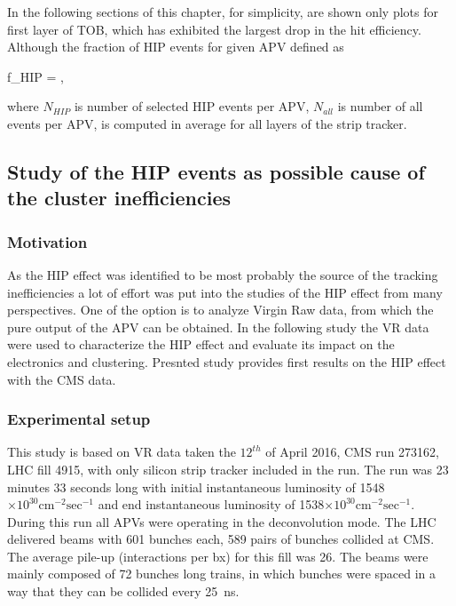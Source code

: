In the following sections of this chapter, for simplicity, are shown only plots for first layer of TOB, which has exhibited the largest drop in the hit efficiency. Although the fraction of HIP events for given APV defined as


{
f_{HIP} = ,
}

where $N_{HIP}$ is number of selected HIP events per APV, $N_{all}$ is number of all events per APV, is computed in average for all layers of the strip tracker.


\subsection{Study of the HIP events as possible cause of the cluster inefficiencies~\label{sec:firstStudy}}

\subsubsection{Motivation}

As the HIP effect was identified to be most probably the source of the tracking inefficiencies a lot of effort was put into the studies of the HIP effect from many perspectives. One of the option is to analyze Virgin Raw data, from which the pure output of the APV can be obtained. In the following study the VR data were used to characterize the HIP effect and evaluate its impact on the electronics and clustering. Presnted study provides first results on the HIP effect with the CMS data.

\subsubsection{Experimental setup} 

This study is based on VR data taken the $12^{th}$ of April 2016, CMS run 273162, LHC fill 4915, with only silicon strip tracker included in the run. The run was 23 minutes 33 seconds long with initial instantaneous luminosity of 1548$\times 10^{30} \mathrm{cm^{-2} sec^{-1}}$ and end instantaneous luminosity of 1538$\times 10^{30} \mathrm{cm^{-2} sec^{-1}}$. During this run all APVs were operating in the deconvolution mode. The LHC delivered beams with 601 bunches each, 589 pairs of bunches collided at CMS. The average pile-up (interactions per bx) for this fill was 26. The beams were mainly composed of 72 bunches long trains, in which bunches were spaced in a way that they can be collided every 25~ns.

